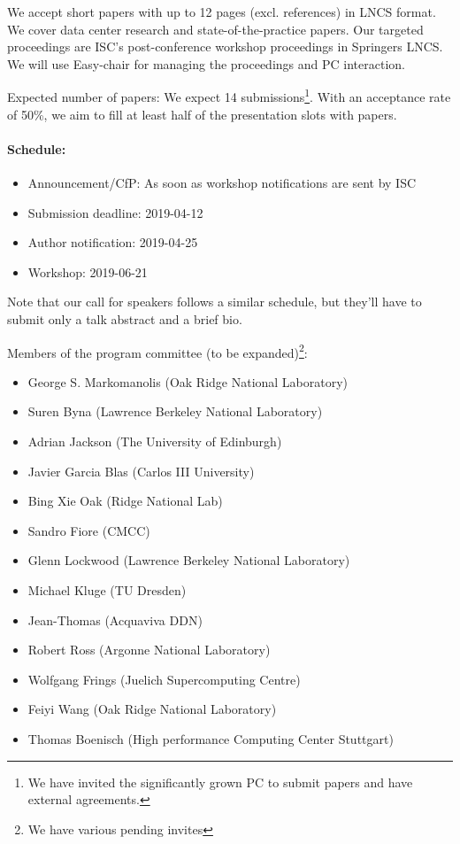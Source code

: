 \documentclass[a4paper,10pt]{article}
\begin{document}
We accept short papers with up to 12 pages (excl. references) in LNCS format.
We cover data center research and state-of-the-practice papers.
Our targeted proceedings are ISC's post-conference workshop proceedings in Springers LNCS.
We will use Easy-chair for managing the proceedings and PC interaction.

Expected number of papers: We expect 14 submissions\footnote{We have invited the significantly grown PC to submit papers and have external agreements.}.
With an acceptance rate of 50\%, we aim to fill at least half of the presentation slots with papers.

\paragraph{Schedule:}
\begin{itemize}
  \item Announcement/CfP: As soon as workshop notifications are sent by ISC
  \item Submission deadline: 2019-04-12
  \item Author notification: 2019-04-25
  \item Workshop: 2019-06-21
\end{itemize}
Note that our call for speakers follows a similar schedule, but they'll have to submit only a talk abstract and a brief bio.

Members of the program committee (to be expanded)\footnote{We have various pending invites}:
\begin{itemize}
  \item George S.	Markomanolis	(Oak Ridge National Laboratory)
  \item Suren	Byna	(Lawrence Berkeley National Laboratory)
  \item Adrian	Jackson	(The University of Edinburgh)
  \item Javier	Garcia Blas	(Carlos III University)
  \item Bing	Xie	Oak (Ridge National Lab)
  \item Sandro	Fiore	(CMCC)
  \item Glenn	Lockwood	(Lawrence Berkeley National Laboratory)
  \item Michael	Kluge	(TU Dresden)
  \item Jean-Thomas	(Acquaviva	DDN)
  \item Robert	Ross	(Argonne National Laboratory)
  \item Wolfgang	Frings	(Juelich Supercomputing Centre)
  \item Feiyi	Wang	(Oak Ridge National Laboratory)
  \item Thomas	Boenisch	(High performance Computing Center Stuttgart)
\end{itemize}
\end{document}
